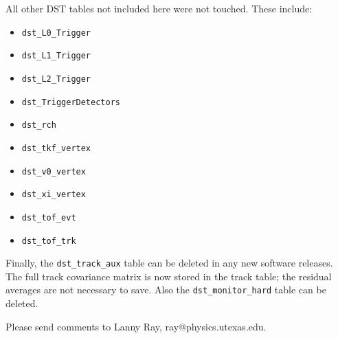 \vspace{0.1in}
\vspace{0.05in}

All other DST tables not included here were not touched.  These include:
\begin{itemize}
\item
{\tt dst\_L0\_Trigger}
\item
{\tt dst\_L1\_Trigger}
\item
{\tt dst\_L2\_Trigger}
\item
{\tt dst\_TriggerDetectors}
\item
{\tt dst\_rch}
\item
{\tt dst\_tkf\_vertex}
\item
{\tt dst\_v0\_vertex}
\item
{\tt dst\_xi\_vertex}
\item
{\tt dst\_tof\_evt}
\item
{\tt dst\_tof\_trk}
\end{itemize}

Finally, the {\tt dst\_track\_aux} table can be deleted in any new software
releases.  The full track covariance matrix is now stored in the track
table; the residual averages are not necessary to save.  Also the
{\tt dst\_monitor\_hard} table can be deleted.

Please send comments to Lanny Ray, ray@physics.utexas.edu.


